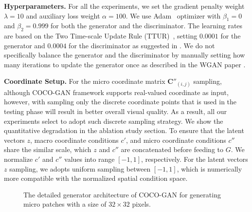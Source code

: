 \documentclass{article}
\newcommand{\modelName}{COCO-GAN }
\begin{document}
\begin{appendices}
    \vspace{0.5em} \noindent \textbf{Hyperparameters.} For all the experiments, we set the gradient penalty weight $\lambda=10$ and auxiliary loss weight $\alpha=100$. We use Adam~\cite{Adam} optimizer with $\beta_1 = 0$ and $\beta_2 = 0.999$ for both the generator and the discriminator. The learning rates are based on the Two Time-scale Update Rule (TTUR)~\cite{fid}, setting $0.0001$ for the generator and $0.0004$ for the discriminator as suggested in \cite{SAGAN}. We do not specifically balance the generator and the discriminator by manually setting how many iterations to update the generator once as described in the WGAN paper \cite{WGAN}.
    
    \vspace{0.5em} \noindent \textbf{Coordinate Setup.} For the micro coordinate matrix $\bm{C}''_{(i,j)}$ sampling, although COCO-GAN framework supports real-valued coordinate as input, however, with sampling only the discrete coordinate points that is used in the testing phase will result in better overall visual quality. As a result, all our experiments select to adopt such discrete sampling strategy. We show the quantitative degradation in the ablation study section. To ensure that the latent vectors $z$, macro coordinate conditions $c'$, and micro coordinate conditions $c''$ share the similar scale, which $z$ and $c''$ are concatenated before feeding to $G$. We normalize $c'$ and $c''$ values into range $[-1, 1]$, respectively. For the latent vectors $z$ sampling, we adopts uniform sampling between $[-1, 1]$, which is numerically more compatible with the normalized spatial condition space.
    
    \begin{figure}[H]
        \vspace{-1em}
        \hfill {}\hfill {}\hfill
        \caption{The detailed generator architecture of \modelName for generating micro patches with a size of $32\times 32$ pixels.}
        \label{fig:architecture-detail-G}
        \vspace{-1em}
    \end{figure}
\begin{figure}[H]
        \centering
        \hfill {}\vspace{2em}
        \vspace{1em}
        

\end{figure}
\end{appendices}
\end{document}
